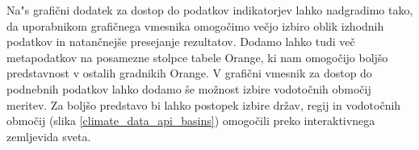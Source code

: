 Na"s grafični dodatek za dostop do podatkov indikatorjev lahko nadgradimo tako,
da uporabnikom grafičnega vmesnika omogočimo večjo izbiro oblik izhodnih
podatkov in natančnejše presejanje rezultatov. Dodamo lahko tudi več
metapodatkov na posamezne stolpce tabele Orange, ki nam omogočijo boljšo
predstavnost v ostalih gradnikih Orange. V grafični vmesnik za dostop do
podnebnih podatkov lahko dodamo še možnost izbire vodotočnih območij meritev.
Za boljšo predstavo bi lahko postopek izbire držav, regij in vodotočnih
območij (slika \ref{climate_data_api_basins}) omogočili preko interaktivnega 
zemljevida sveta.

% 
% 
